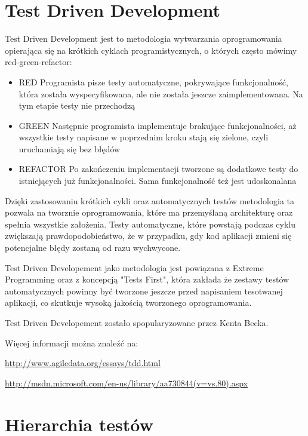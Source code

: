 \documentclass[brudnopis]{xmgr}
\begin{document}
\section{Test Driven Development}

Test Driven Development jest to metodologia wytwarzania oprogramowania opierająca się na krótkich cyklach programistycznych, o których często mówimy red-green-refactor:
\begin{itemize}
  \item RED Programista pisze testy automatyczne, pokrywające funkcjonalność, która została wyspecyfikowana, ale nie została jeszcze zaimplementowana. Na tym etapie testy nie przechodzą
  \item GREEN Następnie programista implementuje brakujące funkcjonalności, aż wszystkie testy napisane w poprzednim kroku stają się zielone, czyli uruchamiają się bez błędów
  \item REFACTOR Po zakończeniu implementacji tworzone są dodatkowe testy do istniejących już funkcjonalności. Sama funkcjonalność też jest udoskonalana
\end{itemize}

Dzięki zastosowaniu krótkich cykli oraz automatycznych testów metodologia ta pozwala na tworznie oprogramowania, które ma przemyślaną architekturę oraz spełnia wszystkie założenia. Testy automatyczne, które powstają podczas cyklu zwiększają prawdopodobieństwo, że w przypadku, gdy kod aplikacji zmieni się potencjalne błędy zostaną od razu wychwycone. 

Test Driven Developement jako metodologia jest powiązana z Extreme Programming oraz z koncepcją "Tests First", która zakłada że zestawy testów automatycznych powinny być tworzone jeszcze przed napisaniem tesotwanej aplikacji, co skutkuje wysoką jakością tworzonego oprogramowania.   

Test Driven Developement zostało spopularyzowane przez Kenta Becka.

Więcej informacji można znaleźć na:

\url{http://www.agiledata.org/essays/tdd.html}

\url{http://msdn.microsoft.com/en-us/library/aa730844(v=vs.80).aspx}

\section{Hierarchia testów}
\end{document}
